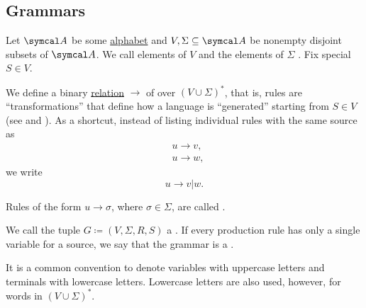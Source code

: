 \subsection{Grammars}\label{subsec:grammars}

\begin{definition}\label{def:grammar}\cite[definition 2.2]{Sipser2013}
  Let \( \Cal{A} \) be some \hyperref[def:language]{alphabet} and \( V, \Sigma \subseteq \Cal{A} \) be nonempty disjoint subsets of \( \Cal{A} \). We call elements of \( V \)  and the elements of \( \Sigma \) . Fix special  \( S \in V \).

  We define a binary \hyperref[def:relation]{relation} \( \to \) of  over \( (V \cup \Sigma)^* \), that is, rules are \enquote{transformations} that define how a language is \enquote{generated} starting from \( S \in V \) (see  and ). As a shortcut, instead of listing individual rules with the same source as
  \begin{align*}
    &u \to v, \\
    &u \to w,
  \end{align*}
  we write
  \begin{equation*}
    u \to v | w.
  \end{equation*}

  Rules of the form \( u \to \sigma \), where \( \sigma \in \Sigma \), are called .

  We call the tuple \( G \coloneqq (V, \Sigma, R, S) \) a . If every production rule has only a single variable for a source, we say that the grammar is a .
\end{definition}

\begin{remark}\label{remark:grammar_symbol_case}
  It is a common convention to denote variables with uppercase letters and terminals with lowercase letters. Lowercase letters are also used, however, for words in \( (V \cup \Sigma)^* \).
\end{remark}

